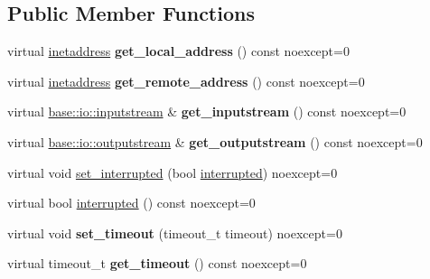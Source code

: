 \subsection*{Public Member Functions}
\begin{DoxyCompactItemize}
\item 
\mbox{\label{structdevfix_1_1net_1_1socket_aba4ce6f76a59c691454669e1fc0e8fd6}} 
virtual \hyperlink{structdevfix_1_1net_1_1inetaddress}{inetaddress} {\bfseries get\+\_\+local\+\_\+address} () const noexcept=0
\item 
\mbox{\label{structdevfix_1_1net_1_1socket_abe198b5e4a8196f9c64a07387e97a76b}} 
virtual \hyperlink{structdevfix_1_1net_1_1inetaddress}{inetaddress} {\bfseries get\+\_\+remote\+\_\+address} () const noexcept=0
\item 
\mbox{\label{structdevfix_1_1net_1_1socket_a3a00115497ccb83e8497a7e33be06b03}} 
virtual \hyperlink{structdevfix_1_1base_1_1io_1_1inputstream}{base\+::io\+::inputstream} \& {\bfseries get\+\_\+inputstream} () const noexcept=0
\item 
\mbox{\label{structdevfix_1_1net_1_1socket_ac0320fa786f14778a3a1e2796d9dce57}} 
virtual \hyperlink{structdevfix_1_1base_1_1io_1_1outputstream}{base\+::io\+::outputstream} \& {\bfseries get\+\_\+outputstream} () const noexcept=0
\item 
virtual void \hyperlink{structdevfix_1_1net_1_1socket_a3fa8d7dcd44e7740b29ad6674005eb5d}{set\+\_\+interrupted} (bool \hyperlink{structdevfix_1_1net_1_1socket_a7cfe151f1124d46fb19fad0c374c9352}{interrupted}) noexcept=0
\item 
virtual bool \hyperlink{structdevfix_1_1net_1_1socket_a7cfe151f1124d46fb19fad0c374c9352}{interrupted} () const noexcept=0
\item 
\mbox{\label{structdevfix_1_1net_1_1socket_ae1cf3b2c4f5d39225d6585c387f967d5}} 
virtual void {\bfseries set\+\_\+timeout} (timeout\+\_\+t timeout) noexcept=0
\item 
\mbox{\label{structdevfix_1_1net_1_1socket_afac86b6ad30a758ce590e7a144764967}} 
virtual timeout\+\_\+t {\bfseries get\+\_\+timeout} () const noexcept=0
\end{DoxyCompactItemize}
